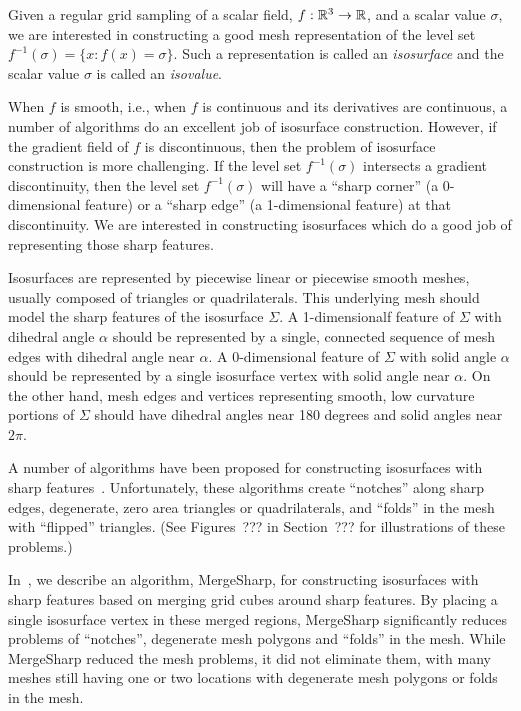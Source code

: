 

\maketitle

Given a regular grid sampling of a scalar field, $f: \mathbb{R}^{3} \rightarrow \mathbb{R}$,
and a scalar value $\sigma$,
we are interested in constructing a good mesh representation
of the level set $f^{-1}(\sigma) = \{x : f(x) = \sigma \}$.
Such a representation is called an {\em isosurface} 
and the scalar value $\sigma$ is called an {\em isovalue}.

When $f$ is smooth,
i.e., when $f$ is continuous and its derivatives are continuous,
a number of algorithms do an excellent job of isosurface construction.
However, if the gradient field of $f$ is discontinuous,
then the problem of isosurface construction is more challenging.
If the level set $f^{-1}(\sigma)$ intersects a gradient discontinuity,
then the level set $f^{-1}(\sigma)$ will have a ``sharp corner''
(a 0-dimensional feature) or a ``sharp edge'' (a 1-dimensional feature)
at that discontinuity.
We are interested in constructing isosurfaces
which do a good job of representing those sharp features.

Isosurfaces are represented by piecewise linear or piecewise smooth meshes,
usually composed of triangles or quadrilaterals.
This underlying mesh should model the sharp features
of the isosurface $\Sigma$.
A 1-dimensionalf feature of $\Sigma$ with dihedral angle $\alpha$
should be represented by a single, 
connected sequence of mesh edges with dihedral angle near $\alpha$.
A 0-dimensional feature of $\Sigma$ with solid angle $\alpha$
should be represented by a single
isosurface vertex with solid angle near $\alpha$.
On the other hand, mesh edges and vertices
representing smooth, low curvature portions of $\Sigma$ should have
dihedral angles near 180 degrees and solid angles near $2 \pi$.

A number of algorithms have been proposed
for constructing isosurfaces 
with sharp features~\cite{ab-fpmmo-03,gk-eretm-04,hwco-cmsaf-05,
jlsw-dchd-02,kbsh-fssev-01,ms-ispmg-10,Varadhan:2003:fss,
sw-dmcpc-04,zhk-dctps-04}.
Unfortunately, these algorithms create ``notches'' along sharp edges,
degenerate, zero area triangles or quadrilaterals,
and ``folds'' in the mesh with ``flipped'' triangles.
(See Figures~??? in Section~??? for illustrations of these problems.)

In~\cite{bw-cisec-13},
we describe an algorithm, MergeSharp,
for constructing isosurfaces with sharp features
based on merging grid cubes around sharp features.
By placing a single isosurface vertex in these merged regions,
MergeSharp significantly reduces problems of ``notches'',
degenerate mesh polygons and ``folds'' in the mesh.
While MergeSharp reduced the mesh problems,
it did not eliminate them, 
with many meshes still having
one or two locations with degenerate mesh polygons or folds in the mesh.

